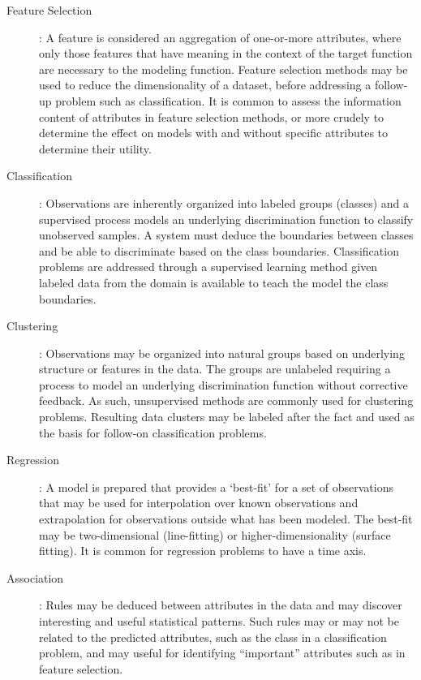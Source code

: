 \begin{description}
	\item[Feature Selection]: A feature is considered an aggregation of one-or-more attributes, where only those features that have meaning in the context of the target function are necessary to the modeling function. Feature selection methods may be used to reduce the dimensionality of a dataset, before addressing a follow-up problem such as classification. It is common to assess the information content of attributes in feature selection methods, or more crudely to determine the effect on models with and without specific attributes to determine their utility.
	
	\item[Classification]: Observations are inherently organized into labeled groups (classes) and a supervised process models an underlying discrimination function to classify unobserved samples. A system must deduce the boundaries between classes and be able to discriminate based on the class boundaries. Classification problems are addressed through a supervised learning method given labeled data from the domain is available to teach the model the class boundaries. 
	
	\item[Clustering]: Observations may be organized into natural groups based on underlying structure or features in the data. The groups are unlabeled requiring a process to model an underlying discrimination function without corrective feedback. As such, unsupervised methods are commonly used for clustering problems. Resulting data clusters may be labeled after the fact and used as the basis for follow-on classification problems.
	
	\item[Regression]: A model is prepared that provides a `best-fit' for a set of observations that may be used for interpolation over known observations and extrapolation for observations outside what has been modeled. The best-fit may be two-dimensional (line-fitting) or higher-dimensionality (surface fitting). It is common for regression problems to have a time axis.
	
	\item[Association]: Rules may be deduced between attributes in the data and may discover interesting and useful statistical patterns. Such rules may or may not be related to the predicted attributes, such as the class in a classification problem, and may useful for identifying ``important'' attributes such as in feature selection.
		
\end{description}
